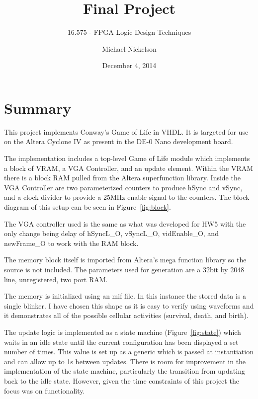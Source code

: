 \documentclass[twoside, letterpaper]{report}
\author{Michael Nickelson}
\title{Final Project}
\subtitle{16.575 - FPGA Logic Design Techniques}
\date{December 4, 2014}
\begin{document}
\maketitle
\newpage\null\thispagestyle{empty}\newpage
{}
\setcounter{page}{1}
\tableofcontents
\cleardoublepage

\chapter{Summary}
\setcounter{page}{1}

This project implements Conway's Game of Life in VHDL. It is targeted for use on the Altera Cyclone IV as present in the DE-0 Nano development board.

The implementation includes a top-level Game of Life module which implements a block of VRAM, a VGA Controller, and an update element. Within the VRAM there is a block RAM pulled from the Altera superfunction library. Inside the VGA Controller are two parameterized counters to produce hSync and vSync, and a clock divider to provide a 25MHz enable signal to the counters. The block diagram of this setup can be seen in Figure~\ref{fig:block}.
\newline
\par
The VGA controller used is the same as what was developed for HW5 with the only change being delay of hSyncL\_O, vSyncL\_O, vidEnable\_O, and newFrame\_O to work with the RAM block.
\newline
\par
The memory block itself is imported from Altera's mega function library so the source is not included. The parameters used for generation are a 32bit by 2048 line, unregistered, two port RAM.

The memory is initialized using an mif file. In this instance the stored data is a single blinker. I have chosen this shape as it is easy to verify using waveforms and it demonstrates all of the possible cellular activities (survival, death, and birth).
\newline
\par
The update logic is implemented as a state machine (Figure~\ref{fig:state}) which waits in an idle state until the current configuration has been displayed a set number of times. This value is set up as a generic which is passed at instantiation and can allow up to 1s between updates.
There is room for improvement in the implementation of the state machine, particularly the transition from updating back to the idle state. However, given the time constraints of this project the focus was on functionality.
\end{document}

